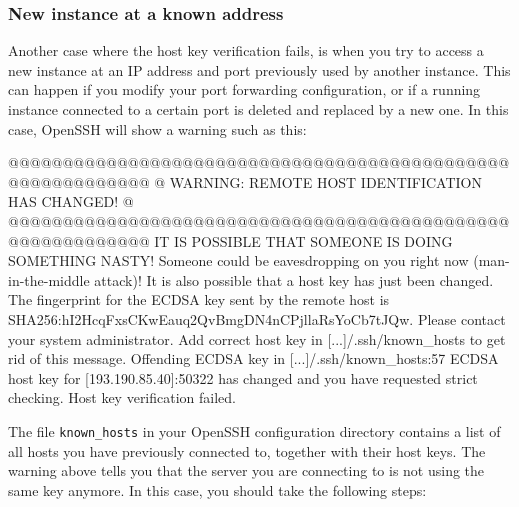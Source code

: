 \subsubsection{New instance at a known address}
Another case where the host key verification fails, is when you try to access a new instance at an IP address and port previously used by another instance.  This can happen if you modify your port forwarding configuration, or if a running instance connected to a certain port is deleted and replaced by a new one.  In this case, OpenSSH will show a warning such as this:

\begin{prompt}
@@@@@@@@@@@@@@@@@@@@@@@@@@@@@@@@@@@@@@@@@@@@@@@@@@@@@@@@@@@
@    WARNING: REMOTE HOST IDENTIFICATION HAS CHANGED!     @
@@@@@@@@@@@@@@@@@@@@@@@@@@@@@@@@@@@@@@@@@@@@@@@@@@@@@@@@@@@
IT IS POSSIBLE THAT SOMEONE IS DOING SOMETHING NASTY!
Someone could be eavesdropping on you right now (man-in-the-middle attack)!
It is also possible that a host key has just been changed.
The fingerprint for the ECDSA key sent by the remote host is
SHA256:hI2HcqFxsCKwEauq2QvBmgDN4nCPjllaRsYoCb7tJQw.
Please contact your system administrator.
Add correct host key in [...]/.ssh/known_hosts to get rid of this message.
Offending ECDSA key in [...]/.ssh/known_hosts:57
ECDSA host key for [193.190.85.40]:50322 has changed and you have requested strict checking.
Host key verification failed.
\end{prompt}

The file \lstinline{known_hosts} in your OpenSSH configuration
directory contains a list of all hosts you have previously connected
to, together with their host keys.  The warning above tells you that
the server you are connecting to is not using the same key anymore.
In this case, you should take the following steps:

